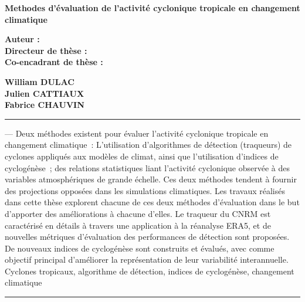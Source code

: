 \documentclass[../main.tex]{subfiles}
\begin{document}
\cleartoevenpage[\thispagestyle{empty}]
\thispagestyle{empty}

\begin{center}
\Large\textbf{Methodes d'évaluation de l'activité cyclonique tropicale en changement climatique\\}
\end{center}
\vspace{1cm}

	\begin{minipage}[t]{0.495\textwidth}

		\large{\textbf{Auteur :}} \\
		\large{\textbf{Directeur de thèse :}} \\
  		\large{\textbf{Co-encadrant de thèse :}}

	\end{minipage}
	\hfill{}
	\begin{minipage}[t]{0.495\textwidth}

		\large{\textbf{William DULAC}} \\
		\large{\textbf{Julien CATTIAUX}} \\
  		\large{\textbf{Fabrice CHAUVIN}}\\

	\end{minipage}

\vspace{1cm}
\noindent\rule[2pt]{\textwidth}{0.5pt}
 --- Deux méthodes existent pour évaluer l’activité cyclonique tropicale en changement climatique : L’utilisation
d’algorithmes de détection (traqueurs) de cyclones appliqués aux modèles de climat, ainsi que l’utilisation d’indices de cyclogénèse ; des relations
statistiques liant l’activité cyclonique observée à des variables atmosphériques de grande échelle. Ces deux méthodes tendent à fournir des projections opposées
dans les simulations climatiques. Les travaux réalisés dans cette thèse explorent chacune de ces deux méthodes d’évaluation dans le but d’apporter des
améliorations à chacune d’elles. Le traqueur du CNRM est caractérisé en détails à travers une application à la réanalyse ERA5, et de nouvelles métriques
d’évaluation des performances de détection sont proposées. De nouveaux indices de cyclogénèse sont construits et évalués, avec comme objectif principal
d’améliorer la représentation de leur variabilité interannuelle.\\
    Cyclones tropicaux, algorithme de détection, indices de cyclogénèse, changement climatique 
\\
\noindent\rule[2pt]{\textwidth}{0.5pt}
\end{document}

